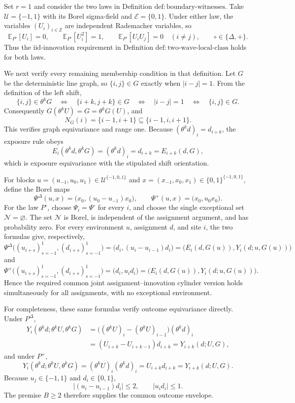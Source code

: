Set \(r=1\) and consider the two laws in Definition \(\mathrm{def{:}boundary\text{-}witnesses}\).  Take \(\mathcal U=\{-1,1\}\) with its Borel sigma-field and \(\mathcal E=\{0,1\}\).  Under either law, the variables \((U_i)_{i\in\mathbb Z}\) are independent Rademacher variables, so
\[
 \mathbb E_{P^{\circ}}[U_i]=0,
 \qquad
 \mathbb E_{P^{\circ}}[U_i^2]=1,
 \qquad
 \mathbb E_{P^{\circ}}[U_iU_j]=0\quad(i\ne j),
 \qquad \circ\in\{\Delta,+\}.
\]
Thus the iid-innovation requirement in Definition \(\mathrm{def{:}two\text{-}wave\text{-}local\text{-}class}\) holds for both laws.

We next verify every remaining membership condition in that definition.  Let \(G\) be the deterministic line graph, so \(\{i,j\}\in G\) exactly when \(|i-j|=1\).  From the definition of the left shift,
\[
 \{i,j\}\in\theta^kG
 \quad\Longleftrightarrow\quad
 \{i+k,j+k\}\in G
 \quad\Longleftrightarrow\quad
 |i-j|=1
 \quad\Longleftrightarrow\quad
 \{i,j\}\in G.
\]
Consequently \(G(\theta^kU)=G=\theta^kG(U)\), and
\[
 N_G(i)=\{i-1,i+1\}\subseteq\{i-1,i,i+1\}.
\]
This verifies graph equivariance and range one.  Because \((\theta^kd)_i=d_{i+k}\), the exposure rule obeys
\[
 E_i(\theta^kd,\theta^kG)=(\theta^kd)_i=d_{i+k}=E_{i+k}(d,G),
\]
which is exposure equivariance with the stipulated shift orientation.

For blocks \(u=(u_{-1},u_0,u_1)\in\mathcal U^{\{-1,0,1\}}\) and \(x=(x_{-1},x_0,x_1)\in\{0,1\}^{\{-1,0,1\}}\), define the Borel maps
\[
 \Psi^{\Delta}(u,x)=\bigl(x_0,(u_0-u_{-1})x_0\bigr),
 \qquad
 \Psi^{+}(u,x)=\bigl(x_0,u_0x_0\bigr).
\]
For the law \(P^{\circ}\), choose \(\Psi_i=\Psi^{\circ}\) for every \(i\), and choose the single exceptional set \(\mathcal N=\varnothing\).  The set \(\mathcal N\) is Borel, is independent of the assignment argument, and has probability zero.  For every environment \(u\), assignment \(d\), and site \(i\), the two formulas give, respectively,
\[
 \Psi^{\Delta}\bigl((u_{i+s})_{s=-1}^{1},(d_{i+s})_{s=-1}^{1}\bigr)
 =\bigl(d_i,(u_i-u_{i-1})d_i\bigr)
 =\bigl(E_i(d,G(u)),Y_i(d;u,G(u))\bigr)
\]
and
\[
 \Psi^{+}\bigl((u_{i+s})_{s=-1}^{1},(d_{i+s})_{s=-1}^{1}\bigr)
 =\bigl(d_i,u_id_i\bigr)
 =\bigl(E_i(d,G(u)),Y_i(d;u,G(u))\bigr).
\]
Hence the required common joint assignment--innovation cylinder version holds simultaneously for all assignments, with no exceptional environment.

For completeness, these same formulas verify outcome equivariance directly.  Under \(P^{\Delta}\),
\[
\begin{aligned}
 Y_i(\theta^kd;\theta^kU,\theta^kG)
 &=\bigl((\theta^kU)_i-(\theta^kU)_{i-1}\bigr)(\theta^kd)_i\\
 &=(U_{i+k}-U_{i+k-1})d_{i+k}
 =Y_{i+k}(d;U,G),
\end{aligned}
\]
and under \(P^+\),
\[
 Y_i(\theta^kd;\theta^kU,\theta^kG)
 = (\theta^kU)_i(\theta^kd)_i
 = U_{i+k}d_{i+k}
 =Y_{i+k}(d;U,G).
\]
Because \(u_j\in\{-1,1\}\) and \(d_i\in\{0,1\}\),
\[
 |(u_i-u_{i-1})d_i|\le2,
 \qquad
 |u_id_i|\le1.
\]
The premise \(B\ge2\) therefore supplies the common outcome envelope.

